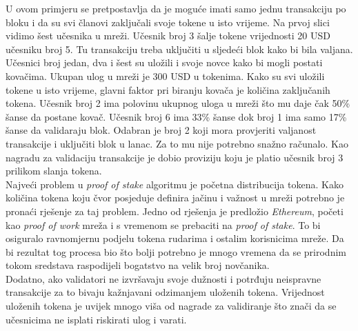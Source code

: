 \documentclass[times, utf8, zavrsni, numeric]{fer}
\begin{document}
\pagebreak
U ovom primjeru se pretpostavlja da je moguće imati samo jednu transakciju po bloku i da su svi članovi zaključali svoje tokene u isto vrijeme.
Na prvoj slici vidimo šest učesnika u mreži. Učesnik broj 3 šalje tokene vrijednosti 20 USD učesniku broj 5. Tu transakciju treba uključiti u sljedeći blok kako bi bila valjana.
Učesnici broj jedan, dva i šest su uložili i svoje novce kako bi mogli postati kovačima. Ukupan ulog u mreži je 300 USD u tokenima. Kako su svi uložili tokene u isto vrijeme,
glavni faktor pri biranju kovača je količina zaključanih tokena. Učesnik broj 2 ima polovinu ukupnog uloga u mreži što mu daje čak 50\% šanse da postane kovač.
Učesnik broj 6 ima 33\% šanse dok broj 1 ima samo 17\% šanse da validaraju blok. Odabran je broj 2 koji mora provjeriti valjanost transakcije i uključiti blok u lanac.
Za to mu nije potrebno snažno računalo. Kao nagradu za validaciju transakcije je dobio proviziju koju je platio učesnik broj 3 prilikom slanja tokena. \\
Najveći problem u \emph{proof of stake} algoritmu je početna distribucija tokena. Kako količina tokena koju čvor posjeduje definira jačinu i važnost u mreži potrebno
je pronaći rješenje za taj problem. Jedno od rješenja je predložio \emph{Ethereum}, početi kao \emph{proof of work} mreža i s vremenom se prebaciti na \emph{proof of stake}.
To bi osiguralo ravnomjernu podjelu tokena rudarima i ostalim korisnicima mreže. Da bi rezultat tog procesa bio što bolji potrebno je mnogo vremena da se prirodnim 
tokom sredstava raspodijeli bogatstvo na velik broj novčanika. \\
Dodatno, ako validatori ne izvršavaju svoje dužnosti i potrđuju neispravne transakcije za to bivaju kažnjavani odzimanjem uloženih tokena. Vrijednost uloženih tokena je
uvijek mnogo viša od nagrade za validiranje što znači da se učesnicima ne isplati riskirati ulog i varati.
\end{document}
